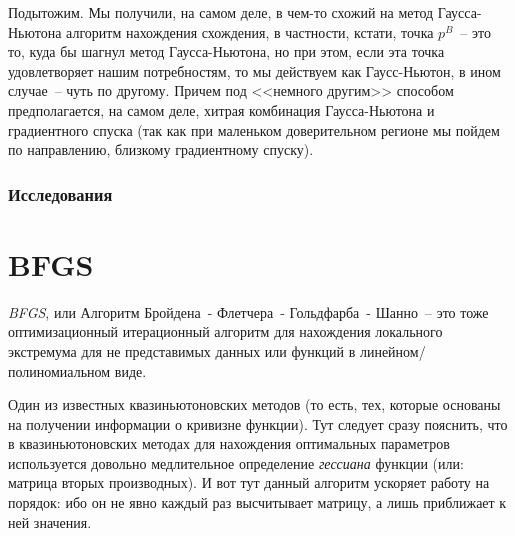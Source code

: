 \documentclass[12pt, a4paper, oneside, final]{article}
\begin{document}
	Подытожим.
	Мы получили, на самом деле, в чем-то схожий на метод Гаусса-Ньютона алгоритм нахождения схождения, в частности, кстати, точка $p^B$~-- это то, куда бы шагнул метод Гаусса-Ньютона, но при этом, если эта точка удовлетворяет нашим потребностям, то мы действуем как Гаусс-Ньютон, в ином случае~-- чуть по другому.
	Причем под <<немного другим>> способом предполагается, на самом деле, хитрая комбинация Гаусса-Ньютона и градиентного спуска (так как при маленьком доверительном регионе мы пойдем по направлению, близкому градиентному спуску).
	\subsubsection*{Исследования}
	\newpage
	\section*{BFGS}
	\textit{BFGS}, или Алгоритм Бройдена~- Флетчера~- Гольдфарба~- Шанно~-- это тоже оптимизационный итерационный алгоритм для нахождения локального экстремума для не представимых данных или функций в линейном/полиномиальном виде.

	Один из известных квазиньютоновских методов (то есть, тех, которые основаны на получении информации о кривизне функции).
	Тут следует сразу пояснить, что в квазиньютоновских методах для нахождения оптимальных параметров используется довольно медлительное определение \textit{гессиана} функции (или: матрица вторых производных).
	И вот тут данный алгоритм ускоряет работу на порядок: ибо он не явно каждый раз высчитывает матрицу, а лишь приближает к ней значения.
\end{document}
